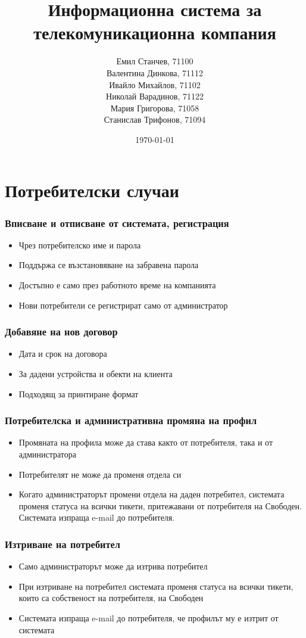 \documentclass{beamer}
\title[ИС за телекомуникационна компания]{Информационна система за телекомуникационна компания}
\author{\tiny {Емил Станчев, 71100 \\
	Валентина Динкова, 71112 \\
	Ивайло Михайлов, 71102 \\
	Николай Варадинов, 71122 \\
	Мария Григорова, 71058 \\
	Станислав Трифонов, 71094 
	}
	}
\institute{ФМИ}
\date{\tiny{\today}}
\begin{document}
\begin{frame}
  \titlepage
\end{frame}

\section{Потребителски случаи}
\begin{frame}
  \frametitle{Вписване и отписване от системата, регистрация}
    \begin{itemize}
      \item Чрез потребителско име и парола
      \item Поддържа се възстановяване на забравена парола
      \item Достъпно е само през работното време на компанията
      \item Нови потребители се регистрират само от администратор
    \end{itemize}
\end{frame}

\begin{frame}
  \frametitle{Добавяне на нов договор}
    \begin{itemize}
	\item Дата и срок на договора
	\item За дадени устройства и обекти на клиента
	\item Подходящ за принтиране формат
    \end{itemize}
\end{frame}

\begin{frame}
  \frametitle{Потребителска и административна промяна на профил}
    \begin{itemize}
	\item Промяната на профила може да става както от потребителя, така и от администратора
	\item Потребителят не може да променя отдела си
	\item Когато администраторът промени отдела на даден потребител, системата променя статуса на всички тикети,
притежавани от потребителя на Свободен. Системата изпраща e-mail до потребителя.
    \end{itemize}
\end{frame}

\begin{frame}
  \frametitle{Изтриване на потребител}
    \begin{itemize}
	\item Само администраторът може да изтрива потребител
	\item При изтриване на потребител системата променя статуса на всички тикети,
 които са собственост на потребителя, на Свободен
	\item Системата изпраща e-mail до потребителя, че профилът му е изтрит от системата

    \end{itemize}
\end{frame}
\end{document}
